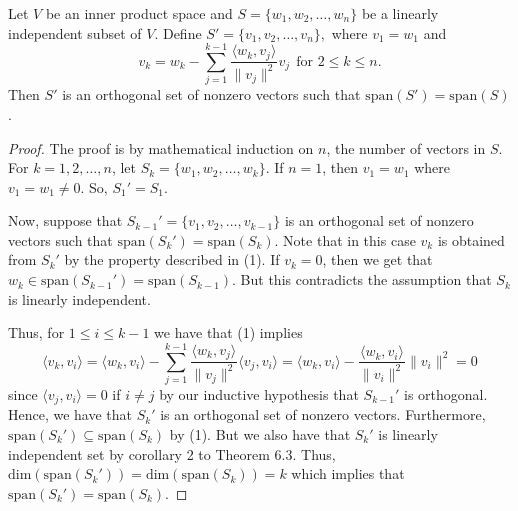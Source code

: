 \begin{theorem}\label{Thereom 6.4}
    Let \( V  \) be an inner product space and \( S = \{ {w}_{1}, {w}_{2}, \dots, {w}_{n} \}  \) be a linearly independent subset of \( V  \). Define \( S' = \{ {v}_{1}, {v}_{2}, \dots, {v}_{n} \},  \) where \( {v}_{1} = {w}_{1} \) and
    \[  {v}_{k} = {w}_{k} - \sum_{ j=1 }^{ k - 1  } \frac{ \langle {w}_{k} , {v}_{j} \rangle }{ \|{v}_{j}\|^{2} } {v}_{j} \ \ \text{for } 2 \leq k \leq n. \tag{1} \]
    Then \( S'  \) is an orthogonal set of nonzero vectors such that \( \text{span}(S') = \text{span}(S) \).
\end{theorem}
\begin{proof}
The proof is by mathematical induction on \( n  \), the number of vectors in \( S  \). For \( k  = 1,2 , \dots, n  \), let \( {S}_{k} = \{ {w}_{1}, {w}_{2}, \dots, {w}_{k} \} \). If \( n = 1  \), then \( {v}_{1} = {w}_{1} \) where \( {v }_{1} = {w}_{1} \neq 0 \). So, \( {S}_{1}' = {S}_{1} \). 

Now, suppose that \( {S}_{k-1}' = \{ {v}_{1}, {v}_{2}, \dots, {v}_{k-1} \}  \) is an orthogonal set of nonzero vectors such that \( \text{span}({S}_{k}') = \text{span}({S}_{k}) \). Note that in this case \( {v}_{k } \) is obtained from \( {S}_{k}' \) by the property described in (1). If \( {v}_{k} = 0  \), then we get that \( {w}_{k} \in \text{span}({S}_{k-1}') = \text{span}({S}_{k-1}) \). But this contradicts the assumption that \( {S}_{k} \) is linearly independent. 

Thus, for \(1 \leq i \leq k - 1\) we have that (1) implies
\[  \langle {v}_{k} , {v}_{i} \rangle = \langle {w}_{k} , {v}_{i} \rangle - \sum_{ j=1  }^{ k-1  } \frac{ \langle {w}_{k} ,  {v}_{j} \rangle }{ \|{v}_{j}\|^{2} }  \langle {v}_{j} , {v}_{i} \rangle = \langle {w}_{k } ,  {v}_{i} \rangle - \frac{ \langle {w}_{k} , {v}_{i} \rangle }{ \|{v}_{i}\|^{2} } \|{v}_{i}\|^{2} = 0 \]
since \( \langle {v}_{j} ,  {v}_{i} \rangle = 0  \) if \( i \neq j \) by our inductive hypothesis that \( {S}_{k-1}' \) is orthogonal. Hence, we have that \( {S}_{k}' \) is an orthogonal set of nonzero vectors. Furthermore, \( \text{span}({S}_{k}') \subseteq \text{span}({S}_{k}) \) by (1). But we also have that \( {S}_{k}' \) is linearly independent set by corollary 2 to Theorem 6.3. Thus, \( \text{dim}(\text{span}({S}_{k}')) = \text{dim}(\text{span}({S}_{k})) = k    \) which implies that \( \text{span}({S}_{k}') = \text{span}({S}_{k}) \).  \end{proof}


